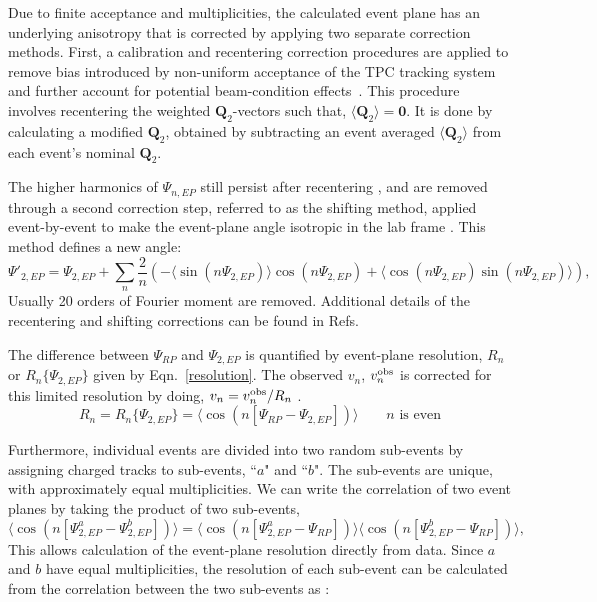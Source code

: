 Due to finite acceptance and multiplicities, the calculated event plane has an underlying anisotropy that is corrected by applying two separate correction methods.  
%
First, a calibration and recentering correction procedures are applied to remove bias introduced by non-uniform acceptance of the TPC tracking system and further account for potential beam-condition effects~\cite{Barrette:1997pt,PhysRevC.55.1420,Poskanzer:1998yz}.  
%
This procedure involves recentering the weighted $\mathbf{Q}_2$-vectors such that, $\langle\mathbf{Q}_2 \rangle = \mathbf{0}$. 
%
It is done by calculating a modified $\mathbf{Q}_2$, obtained by subtracting an event averaged $\langle\mathbf{Q}_2 \rangle$ from each event's nominal $\mathbf{Q}_2$.
%

The higher harmonics of $\Psi_{n,EP}$ still persist after recentering \cite{Poskanzer:1998yz}, and are removed through a second correction step, referred to as  the shifting method, applied event-by-event  to make the event-plane angle isotropic in the lab frame \cite{Voloshin:2008dg}. 
%
This method defines a new angle:
%
\begin{equation}
	\Psi'_{2,EP} = \Psi_{2,EP} + \sum_n \frac{2}{n}
	(- \langle \sin (n\Psi_{2,EP}) \rangle \cos(n\Psi_{2,EP}) + \langle \cos(n\Psi_{2,EP}) \sin(n\Psi_{2,EP}) \rangle) ,
	\label{eqn:Shift}
\end{equation}
%
Usually 20 orders of Fourier moment are removed. 
%
Additional details of the recentering and shifting corrections can be found in Refs.~\cite{Wang:2012bga,Barrette:1997pt,Poskanzer:1998yz}

 The difference between $\Psi_{RP}$ and \(\Psi_{2, EP}\) is quantified by event-plane resolution, $R_n$ or $R_n\{\Psi_{2, EP}\}$ given by Eqn.~\ref{resolution}. 
 The observed $v_n$, $v_n^{\rm obs}$ is corrected for this limited resolution by doing, $v_n = v_{n}^{\rm obs}/R_n$ \cite{Abbas:2013taa,Poskanzer:1998yz}.  
\begin{equation}
	R_n = R_n\{\Psi_{2, EP}\} = \langle \cos(n[\Psi_{RP} - \Psi_{2, EP}]) \rangle \qquad \text{$n$ is even}
	\label{resolution}
\end{equation}

Furthermore, individual events are divided into two random sub-events by assigning charged tracks to sub-events, ``$a$" and ``$b$". 
%
The sub-events are unique, with approximately equal multiplicities. 
%
We can write the correlation of two event planes by taking the product of two sub-events, \cite{Barrette:1996rs,Poskanzer:1998yz}
%
\begin{equation}
	\langle \cos(n[\Psi_{2, EP}^{a} - \Psi_{2, EP}^{b}]) \rangle = 
	\langle \cos(n[\Psi_{2, EP}^{a} - \Psi_{RP}]) \rangle
	\langle \cos(n[\Psi_{2, EP}^{b} - \Psi_{RP}]) \rangle,
	\label{resolution2sub}
\end{equation}
%
This allows calculation of the event-plane resolution directly from data. Since $a$ and $b$ have equal multiplicities, the resolution of each sub-event can be calculated from the correlation between the two sub-events as \cite{Poskanzer:1998yz}:

